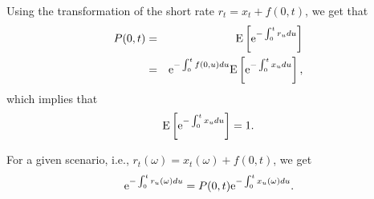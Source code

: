 Using the transformation of the short rate $r_t = x_t + f(0,t)$, we get that
\begin{eqnarray}
P(0,t) &=& \mathrm{E} \left[ \text{e}^{- \int_0^t r_u du} \right] \\
&=& \text{e}^{- \int_0^t f(0,u) du} \mathrm{E} \left[ \text{e}^{- \int_0^t x_u du} \right],
\end{eqnarray}
which implies that
\begin{equation}
\mathrm{E} \left[ \text{e}^{- \int_0^t x_u du} \right] = 1.
\end{equation}

For a given scenario, i.e., $r_t(\omega) = x_t (\omega) + f(0,t)$, we get
\begin{equation}
\text{e}^{- \int_0^t r_u (\omega) du} = P(0,t) \text{e}^{- \int_0^t x_u (\omega) du}.
\end{equation}